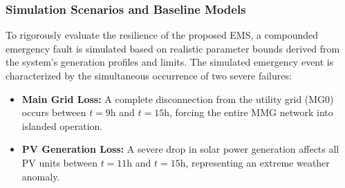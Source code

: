 \begin{table}[htbp]
    \centering
    \caption{Technical and Economic Parameters of DG and BESS}
    \label{tab:dg_bess_params}
\end{table}

\subsubsection{Simulation Scenarios and Baseline Models}
To rigorously evaluate the resilience of the proposed EMS, a compounded emergency fault is simulated based on realistic parameter bounds derived from the system's generation profiles and limits. The simulated emergency event is characterized by the simultaneous occurrence of two severe failures:
\begin{itemize}
    \item \textbf{Main Grid Loss:} A complete disconnection from the utility grid (MG0) occurs between $t=9\text{h}$ and $t=15\text{h}$, forcing the entire MMG network into islanded operation.
    \item \textbf{PV Generation Loss:} A severe drop in solar power generation affects all PV units between $t=11\text{h}$ and $t=15\text{h}$, representing an extreme weather anomaly.
\end{itemize}

